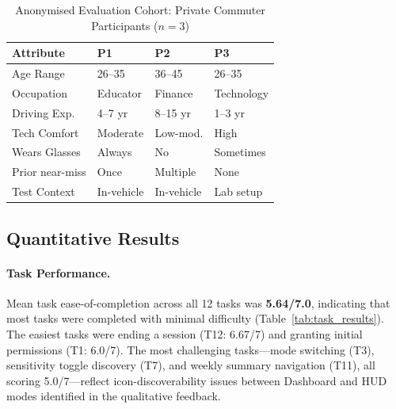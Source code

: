 \documentclass[sigconf]{acmart}
\begin{document}
\begin{table}[H]
\centering
\caption{Anonymised Evaluation Cohort: Private Commuter Participants ($n = 3$)}
\label{tab:eval_participants}
\small
\begin{tabular}{|p{2.2cm}|p{1.5cm}|p{1.5cm}|p{1.5cm}|}
\hline
\textbf{Attribute} & \textbf{P1} & \textbf{P2} & \textbf{P3} \\
\hline
Age Range & 26--35 & 36--45 & 26--35 \\
\hline
Occupation & Educator & Finance & Technology \\
\hline
Driving Exp. & 4--7 yr & 8--15 yr & 1--3 yr \\
\hline
Tech Comfort & Moderate & Low-mod. & High \\
\hline
Wears Glasses & Always & No & Sometimes \\
\hline
Prior near-miss & Once & Multiple & None \\
\hline
Test Context & In-vehicle & In-vehicle & Lab setup \\
\hline
\end{tabular}
\end{table}

\subsection{Quantitative Results}

\paragraph{Task Performance.}
Mean task ease-of-completion across all 12 tasks was \textbf{5.64/7.0}, indicating that most tasks were completed with minimal difficulty (Table~\ref{tab:task_results}). The easiest tasks were ending a session (T12: 6.67/7) and granting initial permissions (T1: 6.0/7). The most challenging tasks---mode switching (T3), sensitivity toggle discovery (T7), and weekly summary navigation (T11), all scoring 5.0/7---reflect icon-discoverability issues between Dashboard and HUD modes identified in the qualitative feedback.
\end{document}
